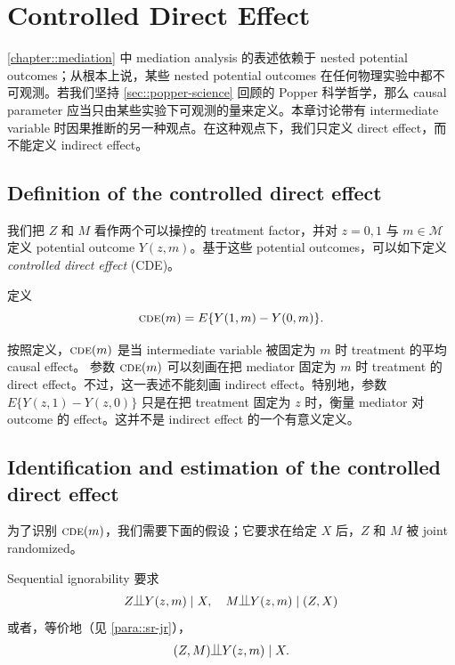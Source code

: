  
\chapter{Controlled Direct Effect}
 \label{chapter::cde}


\cref{chapter::mediation} 中 mediation analysis 的表述依赖于 nested potential outcomes；从根本上说，某些 nested potential outcomes 在任何物理实验中都不可观测。若我们坚持 \cref{sec::popper-science} 回顾的 Popper 科学哲学，那么 causal parameter 应当只由某些实验下可观测的量来定义。本章讨论带有 intermediate variable 时因果推断的另一种观点。在这种观点下，我们只定义 direct effect，而不能定义 indirect effect。





\section{Definition of the controlled direct effect}


我们把 $Z$ 和 $M$ 看作两个可以操控的 treatment factor，并对 $z=0,1$ 与 $m\in \mathcal{M}$ 定义 potential outcome $Y(z,m)$。基于这些 potential outcomes，可以如下定义 { \it controlled direct effect} (CDE)。

\begin{definition}
[CDE]
定义
$$
\textsc{cde} (m)  = E\{  Y(1,m)  - Y(0,m)\}.
$$
\end{definition}
  
 
按照定义，$\textsc{cde} (m) $ 是当 intermediate variable 被固定为 $m$ 时 treatment 的平均 causal effect。
参数 $\textsc{cde}(m)$ 可以刻画在把 mediator 固定为 $m$ 时 treatment 的 direct effect。不过，这一表述不能刻画 indirect effect。特别地，参数
$
E\{  Y(z,1) - Y(z,0)\}
$
只是在把 treatment 固定为 $z$ 时，衡量 mediator 对 outcome 的 effect。这并不是 indirect effect 的一个有意义定义。



\section{Identification and estimation of the controlled direct effect}


为了识别 $\textsc{cde}(m)$，我们需要下面的假设；它要求在给定 $X$ 后，$Z$ 和 $M$ 被 joint randomized。


\begin{assumption}\label{assume::si-cde}
Sequential ignorability 要求
$$
Z\ind Y(z,m) \mid X, \quad M \ind  Y(z,m) \mid (Z,X)
$$
或者，等价地（见 \cref{para::sr-jr}），
$$
(Z,M) \ind  Y(z,m) \mid X.
$$
\end{assumption}

